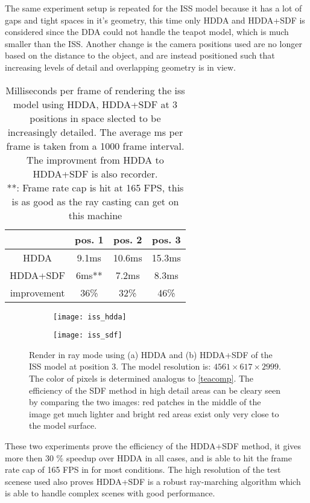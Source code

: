 The same experiment setup is repeated for the ISS model because it has a lot of gaps and tight spaces in it's geometry, this time only HDDA and HDDA+SDF is considered since the DDA could not handle the teapot model, which is much smaller than the ISS. Another change is the camera positions used are no longer based on the distance to the object, and are instead positioned such that increasing levels of detail and overlapping geometry is in view.

\begin{table}[h]
  \centering
  \begin{tabular}{|c||c|c|c|}
    \hline
    & pos. 1 & pos. 2 & pos. 3 \\
    \hline
    HDDA & 9.1ms & 10.6ms & 15.3ms \\
    \hline
    HDDA+SDF & 6ms** & 7.2ms & 8.3ms\\
    \hline
    improvement & 36\% & 32\% & 46\%\\
    \hline
  \end{tabular}
  \caption{Milliseconds per frame of rendering the \acrshort{iss} model using HDDA, HDDA+SDF at 3 positions in space slected to be increasingly detailed. The average ms per frame is taken from a 1000 frame interval. The improvment from HDDA to HDDA+SDF is also recorder. \\
    **: Frame rate cap is hit at 165 FPS, this is as good as the ray casting can get on this machine}
\end{table}

\begin{figure}[H]
  \centering
  \begin{subfigure}[b]{0.48\textwidth}
    \texttt{[image: iss\_hdda]}
    \caption{}
  \end{subfigure}
  \hfill
  \begin{subfigure}[b]{0.48\textwidth}
    \texttt{[image: iss\_sdf]}
    \caption{}
  \end{subfigure}
  \caption{Render in ray mode using (a) HDDA and (b) HDDA+SDF of the ISS model at position 3. The model resolution is: $4561\times617\times2999$. The color of pixels is determined analogus to \cref{teacomp}. The efficiency of the SDF method in high detail areas can be cleary seen by comparing the two images: red patches in the middle of the image get much lighter and bright red areas exist only very close to the model surface.}
\end{figure}

These two experiments prove the efficiency of the HDDA+SDF method, it gives more then 30 \% speedup over HDDA in all cases, and is able to hit the frame rate cap of 165 FPS in for most conditions. The high resolution of the test scenese used also proves HDDA+SDF is a robust ray-marching algorithm which is able to handle complex scenes with good performance.

